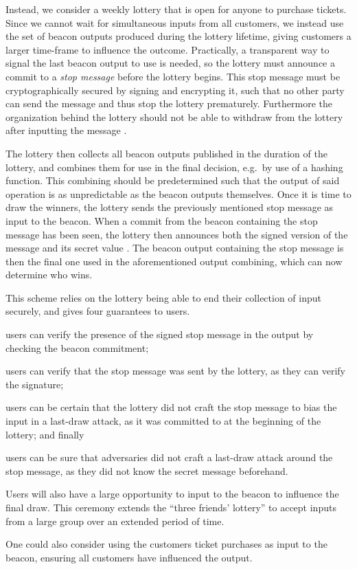 Instead, we consider a weekly lottery that is open for anyone to purchase tickets.
Since we cannot wait for simultaneous inputs from all customers, we instead use the set of beacon outputs produced during the lottery lifetime, giving customers a larger time-frame to influence the outcome.
Practically, a transparent way to signal the last beacon output to use is needed, so the lottery must announce a commit to a \textit{stop message} before the lottery begins.
This stop message must be cryptographically secured by signing and encrypting it, such that no other party can send the message and thus stop the lottery prematurely.
Furthermore the organization behind the lottery should not be able to withdraw from the lottery after inputting the message .

The lottery then collects all beacon outputs published in the duration of the lottery, and combines them for use in the final decision, e.g.\ by use of a hashing function.
This combining should be predetermined such that the output of said operation is as unpredictable as the beacon outputs themselves.
Once it is time to draw the winners, the lottery sends the previously mentioned stop message as input to the beacon.
When a commit from the beacon containing the stop message has been seen, the lottery then announces both the signed version of the message and its secret value .
The beacon output containing the stop message is then the final one used in the aforementioned output combining, which can now determine who wins.

This scheme relies on the lottery being able to end their collection of input securely, and gives four guarantees to users.
\begin{enumberate*}
\item users can verify the presence of the signed stop message in the output by checking the beacon commitment;
\item users can verify that the stop message was sent by the lottery, as they can verify the signature;
\item users can be certain that the lottery did not craft the stop message to bias the input in a last-draw attack, as it was committed to at the beginning of the lottery; and finally
\item users can be sure that adversaries did not craft a last-draw attack around the stop message, as they did not know the secret message beforehand.
\end{enumberate*}

Users will also have a large opportunity to input to the beacon to influence the final draw.
This ceremony extends the \enquote{three friends' lottery} to accept inputs from a large group over an extended period of time.

One could also consider using the customers ticket purchases as input to the beacon, ensuring all customers have influenced the output.

